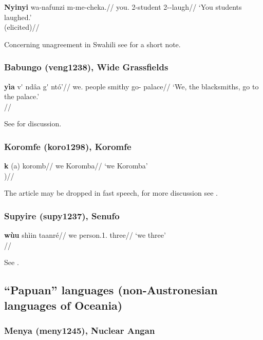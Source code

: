 \documentclass[A4paper]{article}
\begin{document}
\ex 
\begingl
\gla \textbf{Nyinyi} wa-nafunzi m-me-cheka.//
\glb you.\Pl{} \Ncl{}2-student 2\Pl{}-\Pst-laugh//
\glft `You students laughed.'\\(elicited)//
\endgl
\xe

Concerning unagreement \citep{hurtado1985, ackemaneeleman2012unagr} in Swahili see \citet[546]{hoehn2015unagr} for a short note.

\subsubsection{Babungo (veng1238), Wide Grassfields}

\ex
\begingl
\gla  \textbf{yìa} v\'{\textbari}\textbari{} ndâa g\'{\textschwa} ntó'//
\glb we.\Excl{} people smithy go-\Prs{} palace//
\glft `We, the blacksmiths, go to the palace.'\\\citep[197, (134a)]{schaub1985}//
\endgl
\xe

See \citet[197f.]{schaub1985} for discussion.

\subsubsection{Koromfe (koro1298), Koromfe}

\ex 
\begingl
\gla \textbf{\textupsilon{}k\textopeno{}} (a) koromb\textturnv{}//
\glb we \Art{} Koromba//
\glft `we Koromba'\\\citep[251, (585)]{rennison1997})//
\endgl
\xe 

The article may be dropped in fast speech, for more discussion see  \citet[242, 250f.]{rennison1997}.

\subsubsection{Supyire (supy1237), Senufo}

\ex \begingl
\gla \textbf{wùu} shìin taanré//
\glb we person.\Ncl{}1.\Pl{} three//
\glft `we three'\\\citep[after][208, (45a)]{carlson1994}//
\endgl
\xe

See \citealp[207f.]{carlson1994}.


\subsection{``Papuan'' languages (non-Austronesian languages of Oceania)}


\subsubsection{Menya (meny1245), Nuclear Angan}
\end{document}
